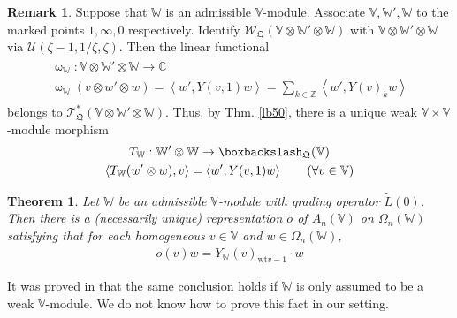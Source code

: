 \documentclass[11pt,b5paper,notitlepage]{article}
\theoremstyle{definition}
\newtheorem{rem}[df]{Remark}
\theoremstyle{plain}
\newtheorem{thm}[df]{Theorem}
\newcommand{\mc}{\mathcal}
\newcommand{\wtd}{\widetilde}
\newcommand{\scr}{\mathscr}
\newcommand{\Vbb}{\mathbb V}
\newcommand{\Wbb}{\mathbb W}
\newcommand{\Cbb}{\mathbb C}
\newcommand{\Zbb}{\mathbb Z}
\newcommand{\wt}{\mathrm{wt}}
\newcommand{\<}{\left\langle}
\renewcommand{\>}{\right\rangle}
\newcommand{\bbs}{\boxbackslash}
\newcommand{\fq}{{\mathfrak Q}}
\numberwithin{equation}{section}
\begin{document}
\begin{rem}\label{lb72}
Suppose that $\Wbb$ is an admissible $\Vbb$-module. Associate $\Vbb,\Wbb',\Wbb$ to the marked points $1,\infty,0$ respectively. Identify $\scr W_{\fq}(\Vbb\otimes\Wbb'\otimes\Wbb)$ with $\Vbb\otimes\Wbb'\otimes\Wbb$ via $\mc U(\zeta-1,1/\zeta,\zeta)$. Then the linear functional
\begin{gather}
\begin{gathered}
\upomega_\Wbb:\Vbb\otimes \Wbb'\otimes\Wbb\rightarrow\Cbb\\
\upomega_\Wbb(v\otimes w'\otimes w)=\<w',Y(v,1)w\>=\sum_{k\in\Zbb}\< w',Y(v)_k w\>
\end{gathered}
\end{gather}
belongs to $\scr T_{\fq}^*(\Vbb\otimes\Wbb'\otimes\Wbb)$. Thus, by Thm. \ref{lb50}, there is a unique weak $\Vbb\times\Vbb$-module morphism
\begin{gather}\label{eq158}
\begin{gathered}
T_\Wbb:\Wbb'\otimes\Wbb\rightarrow\bbs_\fq(\Vbb)\\
\<T_\Wbb(w'\otimes w),v\>=\<w',Y(v,1)w\>\qquad(\forall v\in\Vbb)
\end{gathered}
\end{gather}
\end{rem}


\begin{thm}
Let $\Wbb$ be an admissible $\Vbb$-module with grading operator $\wtd L(0)$. Then there is a (necessarily unique) representation $o$ of $A_n(\Vbb)$ on $\Omega_n(\Wbb)$ satisfying that for each homogeneous $v\in\Vbb$ and $w\in\Omega_n(\Wbb)$,
\begin{align}
o(v)w=Y_\Wbb(v)_{\wt v-1}\cdot w\label{eq151}
\end{align}
\end{thm}

It was proved in \cite{DLM-Zhu} that the same conclusion holds if $\Wbb$ is only assumed to be a weak $\Vbb$-module. We do not know how to prove this fact in our setting.
\end{document}
